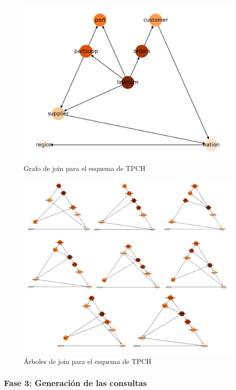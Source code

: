 \begin{figure}
  \centering
  \includegraphics[scale=0.6]{Graphics/joingraph2.png}
  \caption{Grafo de join para el esquema de TPCH}
  \label{fig:graphjoin2}
\end{figure}

\begin{figure}
  \centering
  \includegraphics[scale=0.4]{Graphics/jointreesexp2.png}
  \caption{\'Arboles de join para el esquema de TPCH}
  \label{fig:jointree2}
\end{figure}

\subsubsection{Fase 3: Generaci\'on de las consultas}

